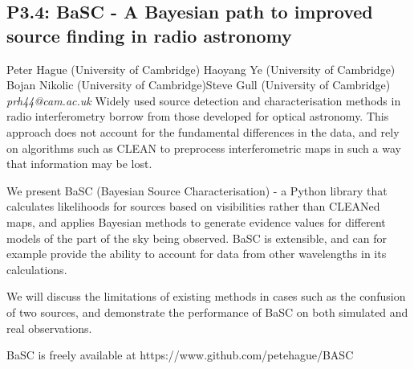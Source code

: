\documentclass{report}
\begin{document}
\subsection*{P3.4: BaSC - A Bayesian path to improved source finding in radio astronomy}
\bigskip
Peter Hague (University of Cambridge) \newline Haoyang Ye (University of Cambridge) \newline  Bojan Nikolic (University of Cambridge)\newline  Steve Gull (University of Cambridge)\newline  \newline  \newline\newline
{\it prh44@cam.ac.uk}\newline
\newline\newline
Widely used source detection and characterisation methods in radio interferometry borrow from those developed for optical astronomy. This approach does not account for the fundamental differences in the data, and rely on algorithms such as CLEAN to preprocess interferometric maps in such a way that information may be lost.

We present BaSC (Bayesian Source Characterisation) - a Python library that calculates likelihoods for sources based on visibilities rather than CLEANed maps, and applies Bayesian methods to generate evidence values for different models of the part of the sky being observed. BaSC is extensible, and can for example provide the ability to account for data from other wavelengths in its calculations.

We will discuss the limitations of existing methods in cases such as the confusion of two sources, and demonstrate the performance of BaSC on both simulated and real observations. 

BaSC is freely available at https://www.github.com/petehague/BASC\newline
\newpage
\end{document}
